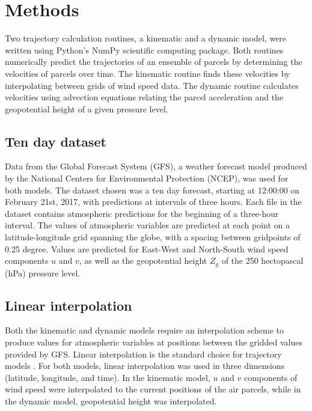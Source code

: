 \chapter{Methods}

Two trajectory calculation routines, a kinematic and a dynamic model, were written using Python's NumPy scientific computing package.
Both routines numerically predict the trajectories of an ensemble of parcels by determining the velocities of parcels over time. 
The kinematic routine finds these velocities by interpolating between grids of wind speed data. 
The dynamic routine calculates velocities using advection equations relating the parcel acceleration and the geopotential height of a given pressure level. 

\section{Ten day dataset}
Data from the Global Forecast System (GFS), a weather forecast model produced by the National Centers for Environmental Protection (NCEP), was used for both models.
The dataset chosen was a ten day forecast, starting at 12:00:00 on February 21st, 2017, with predictions at intervals of three hours.
Each file in the dataset contains atmospheric predictions for the beginning of a three-hour interval. 
The values of atmospheric variables are predicted at each point on a latitude-longitude grid spanning the globe, with a spacing between gridpoints of 0.25 degree.
Values are predicted for East-West and North-South wind speed components $u$ and $v$, as well as the geopotential height $Z_g$ of the 250 hectopascal (hPa) pressure level.

\section{Linear interpolation}
Both the kinematic and dynamic models require an interpolation scheme to produce values for atmospheric variables at positions between the gridded values provided by GFS. 
Linear interpolation is the standard choice for trajectory models \cite{bowman_input_2013}. 
For both models, linear interpolation was used in three dimensions (latitude, longitude, and time). 
In the kinematic model, $u$ and $v$ components of wind speed were interpolated to the current positions of the air parcels, while in the dynamic model, geopotential height was interpolated.

